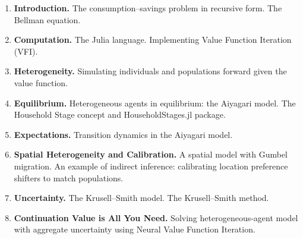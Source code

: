 \documentclass[11pt]{article}
\begin{document}
\begin{enumerate}
  \item \textbf{Introduction.} The consumption--savings problem in recursive form. The Bellman equation.

  \item \textbf{Computation.} The Julia language. Implementing Value Function Iteration (VFI).

  \item \textbf{Heterogeneity.} Simulating individuals and populations forward given the value function.

  \item \textbf{Equilibrium.} Heterogeneous agents in equilibrium: the Aiyagari model.  The Household Stage concept and HouseholdStages.jl package.

  \item \textbf{Expectations.} Transition dynamics in the Aiyagari model.

  \item \textbf{Spatial Heterogeneity and Calibration.} A spatial model with Gumbel migration. An example of indirect inference: calibrating location preference shifters to match populations.

  \item \textbf{Uncertainty.} The Krusell--Smith model. The Krusell--Smith method.

  \item \textbf{Continuation Value is All You Need.} Solving heterogeneous-agent model with aggregate uncertainty using Neural Value Function Iteration.
\end{enumerate}
\end{document}
